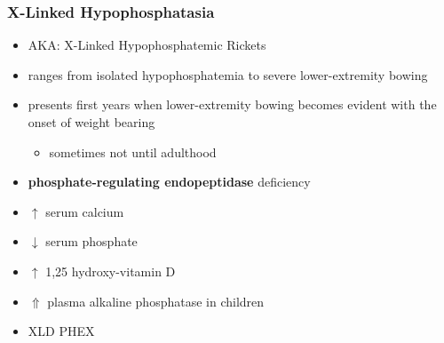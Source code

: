 \documentclass{scrartcl}
\begin{document}
\subsubsection{X-Linked Hypophosphatasia}
\label{sec:orge6c7a96}
\begin{itemize}
\item AKA: X-Linked Hypophosphatemic Rickets
\item ranges from isolated hypophosphatemia to severe lower-extremity bowing
\item presents first  years when lower-extremity bowing becomes
evident with the onset of weight bearing
\begin{itemize}
\item sometimes not until adulthood
\end{itemize}
\item \textbf{phosphate-regulating endopeptidase} deficiency
\item \(\uparrow\) serum calcium
\item \(\downarrow\) serum phosphate
\item \(\uparrow\) 1,25 hydroxy-vitamin D
\item \(\Uparrow\) plasma alkaline phosphatase in children
\item XLD PHEX
\end{itemize}
\end{document}
